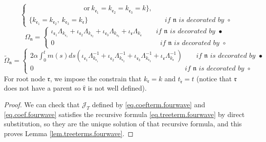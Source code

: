 \begin{lem}
\begin{equation}
\begin{cases}
 \qquad\qquad\qquad\qquad\text{or}\ k_{\mathfrak{e}_1}= k_{\mathfrak{e}_2}= k_{\mathfrak{e}_3}=k\}, 
 \\
 \{k_{\mathfrak{e}_1}=k_{\mathfrak{e}_2},\ k_{\mathfrak{e}_3}=k_{\mathfrak{e}}\} \qquad\qquad\qquad\qquad\qquad\quad\ \textit{if }\mathfrak{n}\textit{ is decorated by }\circ
 \end{cases}
\end{equation}
\begin{equation}
 \Omega_{\mathfrak{n}}=
 \begin{cases}
 \iota_{\mathfrak{e}_1}\Lambda_{k_{\mathfrak{e}_1}}+\iota_{\mathfrak{e}_2}\Lambda_{k_{\mathfrak{e}_2}}+\iota_{\mathfrak{e}_3}\Lambda_{k_{\mathfrak{e}_3}}+\iota_{\mathfrak{e}}\Lambda_{k_{\mathfrak{e}}} \qquad \textit{if }\mathfrak{n}\textit{ is decorated by }\bullet
 \\
 0 \qquad\qquad\qquad\qquad\qquad\qquad \qquad\quad\ \ \textit{if }\mathfrak{n}\textit{ is decorated by }\circ
 \end{cases}
\end{equation}
\begin{equation}
 \widetilde{\Omega}_{\mathfrak{n}}=
 \begin{cases}
 2\alpha \int^t_{0}m(s) ds\left(\iota_{\mathfrak{e}_1}\Lambda_{k_{\mathfrak{e}_1}}^{-1}+\iota_{\mathfrak{e}_2}\Lambda_{k_{\mathfrak{e}_2}}^{-1}+\iota_{\mathfrak{e}_3}\Lambda_{k_{\mathfrak{e}_3}}^{-1}+\iota_{\mathfrak{e}}\Lambda_{k_{\mathfrak{e}}}^{-1}\right) \qquad \textit{if }\mathfrak{n}\textit{ is decorated by }\bullet
 \\
 0 \qquad\qquad\qquad\qquad\qquad\qquad\qquad\qquad\qquad\qquad\quad\ \ \ \ \  \textit{if }\mathfrak{n}\textit{ is decorated by }\circ
 \end{cases}
\end{equation}
For root node $\mathfrak{r}$, we impose the constrain that $k_{\mathfrak{r}}=k$ and $t_{\widehat{\mathfrak{r}}}=t$ (notice that $\mathfrak{r}$ does not have a parent so $\widehat{\mathfrak{r}}$ is not well defined). 
\end{lem}


\begin{proof}
We can check that $\mathcal{J}_T$ defined by \eqref{eq.coefterm.fourwave} and \eqref{eq.coef.fourwave} satisfies the recursive formula \eqref{eq.treeterm.fourwave} by direct substitution, so they are the unique solution of that recursive formula, and this proves Lemma \ref{lem.treeterms.fourwave}.
\end{proof}


